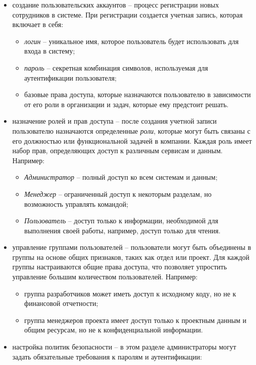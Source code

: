 \begin{itemize}
    \item создание пользовательских аккаунтов -- процесс регистрации новых сотрудников в системе. При регистрации создается учетная запись, которая включает в себя:
    \begin{itemize}
        \item \textit{логин} -- уникальное имя, которое пользователь будет использовать для входа в систему;
        \item \textit{пароль} -- секретная комбинация символов, используемая для аутентификации пользователя;
        \item базовые права доступа, которые назначаются пользователю в зависимости от его роли в организации и задач, которые ему предстоит решать.
    \end{itemize}
    \item назначение ролей и прав доступа -- после создания учетной записи пользователю назначаются определенные \textit{роли}, которые могут быть связаны с его должностью или функциональной задачей в компании. Каждая роль имеет набор прав, определяющих доступ к различным сервисам и данным. Например:
    \begin{itemize}
        \item \textit{Администратор} -- полный доступ ко всем системам и данным;
        \item \textit{Менеджер} -- ограниченный доступ к некоторым разделам, но возможность управлять командой;
        \item \textit{Пользователь} -- доступ только к информации, необходимой для выполнения своей работы, например, доступ только для чтения.
    \end{itemize}
    \item управление группами пользователей -- пользователи могут быть объединены в группы на основе общих признаков, таких как отдел или проект. Для каждой группы настраиваются общие права доступа, что позволяет упростить управление большим количеством пользователей. Например:
    \begin{itemize}
        \item группа разработчиков может иметь доступ к исходному коду, но не к финансовой отчетности;
        \item группа менеджеров проекта имеет доступ только к проектным данным и общим ресурсам, но не к конфиденциальной информации.
    \end{itemize}
    \item настройка политик безопасности -- в этом разделе администраторы могут задать обязательные требования к паролям и аутентификации:

\end{itemize}
